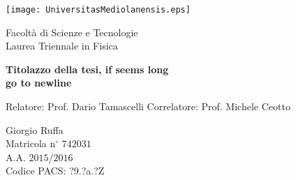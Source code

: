 {
\thispagestyle{empty}

\centerline{
\texttt{[image: UniversitasMediolanensis.eps]}
}

\begin{center}
{\Large Facolt\`a di Scienze e Tecnologie\\
\vskip0.2cm Laurea Triennale in Fisica }
\end{center}


\vskip1.5cm
\begin{center}
{\huge \textbf{Titolazzo della tesi, if seems long\\go to newline}}
\end{center}

{\large
\vskip20mm Relatore:  Prof. Dario Tamascelli
\vskip 1mm Correlatore: Prof. Michele Ceotto\\
}

\vskip2cm
\hskip9cm\parbox[t]{7cm}
{\large 
Giorgio Ruffa\\
Matricola n$^\circ$ $742031$\\
A.A. $2015$/$2016$\\
\vskip 0.5mm Codice PACS: ?9.?a.?Z
}

\newpage
\newpage
\thispagestyle{empty}
\clearpage
}

